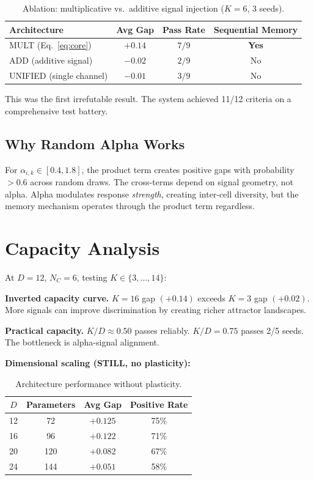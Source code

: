 \documentclass[11pt,a4paper]{article}
\begin{document}
\begin{table}[h]
\centering
\caption{Ablation: multiplicative vs.\ additive signal injection ($K{=}6$, 3 seeds).}
\label{tab:ablation}
\begin{tabular}{lccc}
\toprule
Architecture & Avg Gap & Pass Rate & Sequential Memory \\
\midrule
MULT (Eq.~\ref{eq:core}) & $+0.14$ & $7/9$ & \textbf{Yes} \\
ADD (additive signal) & $-0.02$ & $2/9$ & No \\
UNIFIED (single channel) & $-0.01$ & $3/9$ & No \\
\bottomrule
\end{tabular}
\end{table}

This was the first irrefutable result. The system achieved 11/12 criteria on a comprehensive test battery.

\subsection{Why Random Alpha Works}

For $\alpha_{i,k} \in [0.4, 1.8]$, the product term creates positive gaps with probability ${>}0.6$ across random draws. The cross-terms depend on signal geometry, not alpha. Alpha modulates response \emph{strength}, creating inter-cell diversity, but the memory mechanism operates through the product term regardless.

\section{Capacity Analysis}
\label{sec:capacity}

At $D{=}12$, $N_C{=}6$, testing $K \in \{3,\ldots,14\}$:

\textbf{Inverted capacity curve.} $K{=}16$ gap $(+0.14)$ exceeds $K{=}3$ gap $(+0.02)$. More signals can improve discrimination by creating richer attractor landscapes.

\textbf{Practical capacity.} $K/D \approx 0.50$ passes reliably. $K/D = 0.75$ passes 2/5 seeds. The bottleneck is alpha-signal alignment.

\textbf{Dimensional scaling (STILL, no plasticity):}

\begin{table}[h]
\centering
\caption{Architecture performance without plasticity.}
\label{tab:still}
\begin{tabular}{cccc}
\toprule
$D$ & Parameters & Avg Gap & Positive Rate \\
\midrule
12 & 72 & $+0.125$ & 75\% \\
16 & 96 & $+0.122$ & 71\% \\
20 & 120 & $+0.082$ & 67\% \\
24 & 144 & $+0.051$ & 58\% \\
\bottomrule
\end{tabular}
\end{table}
\end{document}
